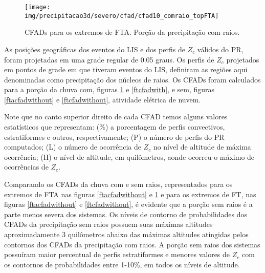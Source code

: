 \begin{figure}[!ht]
  \centering
  \texttt{[image: img/precipitacao3d/severo/cfad/cfad10\_comraio\_topFTA]}
  \caption{CFADs para os extremos de FTA. Porção da precipitação com raios.}
  \label{ftacfadwith}   
\end{figure} 

As posições geográficas dos eventos do LIS e dos perfis de $Z_c$ válidos do PR, foram projetadas em uma grade regular de 0.05 graus. Os perfis de $Z_c$ projetados em pontos de grade em que tiveram eventos do LIS, definiram as regiões aqui denominadas como precipitação dos núcleos de raios. Os CFADs foram calculados para a porção da chuva com, figuras \ref{ftacfadwith} e \ref{ftcfadwith}, e sem, figuras \ref{ftacfadwithout} e \ref{ftcfadwithout}, atividade elétrica de nuvem.

Note que no canto superior direito de cada CFAD temos alguns valores estatísticos que representam: (\%)  a porcentagem de perfis convectivos, estratiformes e outros, respectivamente; (P)  o número de perfis do PR computados; (L)  o número de ocorrência de $Z_c$ no nível de altitude de máxima ocorrência; (H)  o nível de altitude, em quilômetros, aonde ocorreu o máximo de ocorrências de $Z_c$.

Comparando os CFADs da chuva com e sem raios, representados para os extremos de FTA nas figuras \ref{ftacfadwithout} e \ref{ftacfadwith} e para os extremos de FT, nas figuras \ref{ftacfadwithout} e \ref{ftcfadwithout}, é evidente que a porção sem raios é a parte menos severa dos sistemas. Os níveis de contorno de probabilidades dos CFADs da precipitação sem raios possuem suas máximas altitudes aproximadamente 3 quilômetros abaixo das máximas altitudes atingidas pelos contornos dos CFADs da precipitação com raios. A porção sem raios dos sistemas possuíram maior percentual de perfis estratiformes e menores valores de $Z_c$ com os contornos de probabilidades entre 1-10\%, em todos os níveis de altitude.



